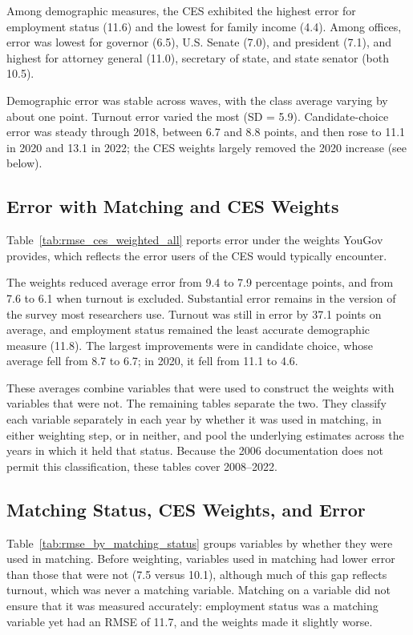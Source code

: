 \documentclass[12pt]{article}
\begin{document}
Among demographic measures, the CES exhibited the highest error for employment status (11.6) and the lowest for family income (4.4). Among offices, error was lowest for governor (6.5), U.S. Senate (7.0), and president (7.1), and highest for attorney general (11.0), secretary of state, and state senator (both 10.5).

Demographic error was stable across waves, with the class average varying by about one point. Turnout error varied the most (SD = 5.9). Candidate-choice error was steady through 2018, between 6.7 and 8.8 points, and then rose to 11.1 in 2020 and 13.1 in 2022; the CES weights largely removed the 2020 increase (see below).


\subsection{Error with Matching and CES Weights}
Table~\ref{tab:rmse_ces_weighted_all} reports error under the weights YouGov provides, which reflects the error users of the CES would typically encounter.
 


The weights reduced average error from 9.4 to 7.9 percentage points, and from 7.6 to 6.1 when turnout is excluded. Substantial error remains in the version of the survey most researchers use. Turnout was still in error by 37.1 points on average, and employment status remained the least accurate demographic measure (11.8). The largest improvements were in candidate choice, whose average fell from 8.7 to 6.7; in 2020, it fell from 11.1 to 4.6.

These averages combine variables that were used to construct the weights with variables that were not. The remaining tables separate the two. They classify each variable separately in each year by whether it was used in matching, in either weighting step, or in neither, and pool the underlying estimates across the years in which it held that status. Because the 2006 documentation does not permit this classification, these tables cover 2008--2022.

\subsection{Matching Status, CES Weights, and Error}

Table~\ref{tab:rmse_by_matching_status} groups variables by whether they were used in matching. Before weighting, variables used in matching had lower error than those that were not (7.5 versus 10.1), although much of this gap reflects turnout, which was never a matching variable. Matching on a variable did not ensure that it was measured accurately: employment status was a matching variable yet had an RMSE of 11.7, and the weights made it slightly worse.
 
\end{document}

